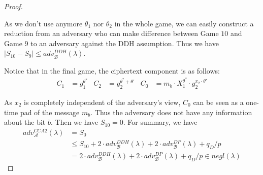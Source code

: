 \begin{proof}
\begin{description}
    As we don't use anymore $\theta_1$ nor $\theta_2$ in the whole game, we can easily construct a reduction from an adversary who can make difference between \textsf{Game} $10$ and \textsf{Game} $9$ to an adversary against the DDH assumption. Thus we have $|S_{10} - S_9| \leq adv_{\mathcal{B}}^{DDH}(\lambda)$.
    
  \end{description}

  Notice that in the final game, the ciphertext component is as follows:
  \begin{align*}
    C_1 &= g_1^{\theta^*} & C_2 &= g_2^{\theta^*+ \theta'} & C_0 &= m_b \cdot X_1^{\theta^*} \cdot g_2^{x_2 \cdot \theta'}
  \end{align*}

  As $x_2$ is completely independent of the adversary's view, $C_0$ can be seen as a one-time pad of the message $m_b$. Thus the adversary does not have any information about the bit $b$. Then we have $S_{10} = 0$.
For summary, we have
\begin{align*}
  adv_{\mathcal{A}}^{CCA2}(\lambda) &= S_0\\
  &\leq S_{10} + 2 \cdot adv_{\mathcal{B}}^{DDH}(\lambda) + 2 \cdot adv_{\mathcal{B}}^{DP}(\lambda) + q_D/p\\
  &= 2 \cdot adv_{\mathcal{B}}^{DDH}(\lambda) + 2 \cdot adv_{\mathcal{B}}^{DP}(\lambda) + q_D/p \in negl(\lambda)
\end{align*}

\end{proof}
